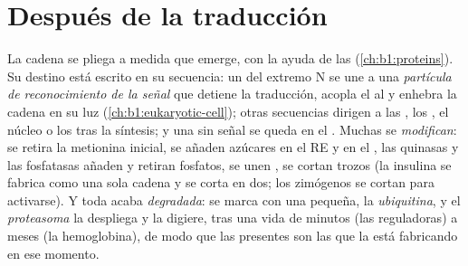 \section{Después de la traducción}

\begin{proposition}\label{prop:b1:gene-expression:after}
La cadena se pliega a medida que emerge, con la ayuda de las 
(\cref{ch:b1:proteins}). Su destino está escrito en su secuencia: un
\emph{} del extremo N se une a una \emph{partícula de
reconocimiento de la señal} que detiene la traducción, acopla el  al
 y enhebra la cadena en su luz
(\cref{ch:b1:eukaryotic-cell}); otras secuencias dirigen  a las
, los , el núcleo o los  tras la
síntesis; y una  sin señal se queda en el . Muchas 
se \emph{modifican}: se retira la metionina inicial, se añaden azúcares en
el RE y en el , las quinasas y las fosfatasas añaden y retiran
fosfatos, se unen , se cortan trozos (la insulina se fabrica como una
sola cadena y se corta en dos; los zimógenos se cortan para activarse). Y
toda  acaba \emph{degradada}: se marca con una  pequeña, la
\emph{ubiquitina}, y el \emph{proteasoma} la despliega y la digiere, tras
una vida de minutos (las  reguladoras) a meses (la hemoglobina), de
modo que las  presentes son las que la  está fabricando en
ese momento.
\end{proposition}

